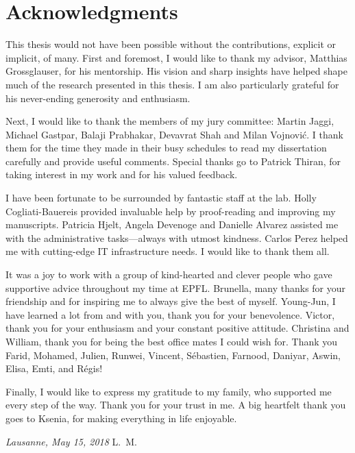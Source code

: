 \chapter*{Acknowledgments}

This thesis would not have been possible without the contributions, explicit or implicit, of many.
First and foremost, I would like to thank my advisor, Matthias Grossglauser, for his mentorship.
His vision and sharp insights have helped shape much of the research presented in this thesis.
I am also particularly grateful for his never-ending generosity and enthusiasm.

Next, I would like to thank the members of my jury committee:
Martin Jaggi, Michael Gastpar, Balaji Prabhakar, Devavrat Shah and Milan Vojnović.
I thank them for the time they made in their busy schedules to read my dissertation carefully and provide useful comments.
Special thanks go to Patrick Thiran, for taking interest in my work and for his valued feedback.

I have been fortunate to be surrounded by fantastic staff at the lab.
Holly Cogliati-Bauereis provided invaluable help by proof-reading and improving my manuscripts.
Patricia Hjelt, Angela Devenoge and Danielle Alvarez assisted me with the administrative tasks---always with utmost kindness.
Carlos Perez helped me with cutting-edge IT infrastructure needs.
I would like to thank them all.

It was a joy to work with a group of kind-hearted and clever people who gave supportive advice throughout my time at EPFL.
Brunella, many thanks for your friendship and for inspiring me to always give the best of myself.
Young-Jun, I have learned a lot from and with you, thank you for your benevolence.
Victor, thank you for your enthusiasm and your constant positive attitude.
Christina and William, thank you for being the best office mates I could wish for.
Thank you
Farid,
Mohamed,
Julien,
Runwei,
Vincent,
Sébastien,
Farnood,
Daniyar,
Aswin,
Elisa,
Emti,
and Régis!

Finally, I would like to express my gratitude to my family, who supported me every step of the way.
Thank you for your trust in me.
A big heartfelt thank you goes to Ksenia, for making everything in life enjoyable.

\bigskip
 
\noindent\textit{Lausanne, May 15, 2018}
\hfill L.~M.
